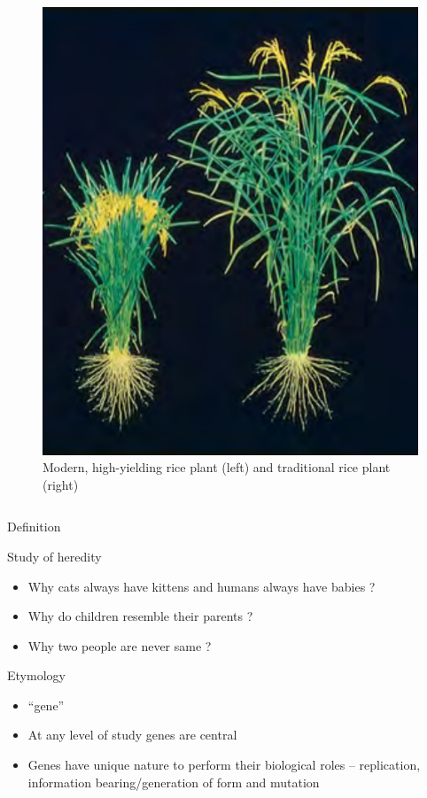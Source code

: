 \documentclass[11pt,ignorenonframetext,aspectratio=169]{beamer}
\providecommand{\tightlist}{%
  \setlength{\itemsep}{0pt}\setlength{\parskip}{0pt}}
\begin{document}
\begin{frame}{}
\begin{columns}[T,onlytextwidth]
\begin{figure}
\includegraphics[width=0.8\linewidth]{../images/green_revolution_crop} \caption{Modern, high-yielding rice plant (left) and traditional rice plant (right)}\label{fig:green-revolution-crop}
\end{figure}

\end{columns}
\end{frame}

\begin{frame}{Definition}
\protect\hypertarget{definition}{}
\begin{block}{Study of heredity}
\protect\hypertarget{study-of-heredity}{}
\begin{itemize}[<+->]
\tightlist
\item
  Why cats always have kittens and humans always have babies ?
\item
  Why do children resemble their parents ?
\item
  Why two people are never same ?
\end{itemize}
\end{block}

\begin{block}{Etymology}
\protect\hypertarget{etymology}{}
\begin{itemize}[<+->]
\tightlist
\item
  ``gene''
\item
  At any level of study genes are central
\item
  Genes have unique nature to perform their biological roles --
  replication, information bearing/generation of form and mutation
\end{itemize}
\end{block}
\end{frame}
\end{document}
